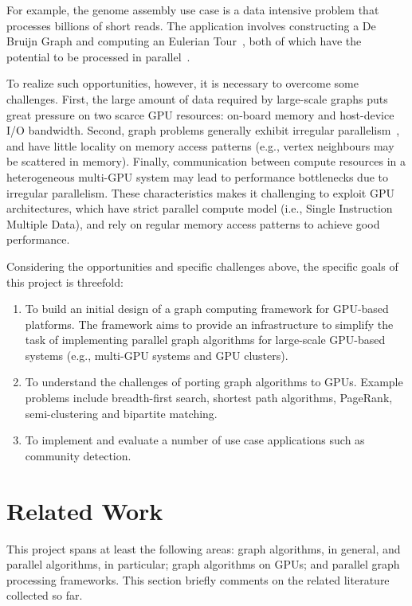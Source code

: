 \documentclass{acm_proc_article-sp}[12pt]
\begin{document}
For example, the genome assembly use case is a data intensive problem that processes billions of short reads. The application involves constructing a De Bruijn Graph and computing an Eulerian Tour~\cite{simpson2009abyss}, both of which have the potential to be processed in parallel~\cite{Cormen2009,Atallah1984}. 

To realize such opportunities, however, it is necessary to overcome some challenges. First, the large amount of data required by large-scale graphs puts great pressure on two scarce GPU resources: on-board memory and host-device I/O bandwidth. Second, graph problems generally exhibit irregular parallelism~\cite{Kulkarni2009}, and have little locality on memory access patterns (e.g., vertex neighbours may be scattered in memory). Finally, communication between compute resources in a heterogeneous multi-GPU system may lead to performance bottlenecks due to irregular parallelism. These characteristics makes it challenging to exploit GPU architectures, which have strict parallel compute model (i.e., Single Instruction Multiple Data), and rely on regular memory access patterns to achieve good performance.

Considering the opportunities and specific challenges above, the specific goals of this project is threefold:

\begin{enumerate}
  \item To build an initial design of a graph computing framework  for GPU-based platforms. The framework aims to provide an infrastructure to simplify the task of implementing parallel graph algorithms for large-scale GPU-based systems (e.g., multi-GPU systems and GPU clusters).

  \item To understand the challenges of porting graph algorithms to GPUs. Example problems include breadth-first search, shortest path algorithms, PageRank, semi-clustering and bipartite matching.

  \item To implement and evaluate a number of use case applications such as community detection. 
\end{enumerate}

\section{Related Work}
\label{sec:related}
This project spans at least the following areas: graph algorithms, in general, and parallel algorithms, in particular; graph algorithms on GPUs; and parallel graph processing frameworks. This section briefly comments on the related literature collected so far.
\end{document}

